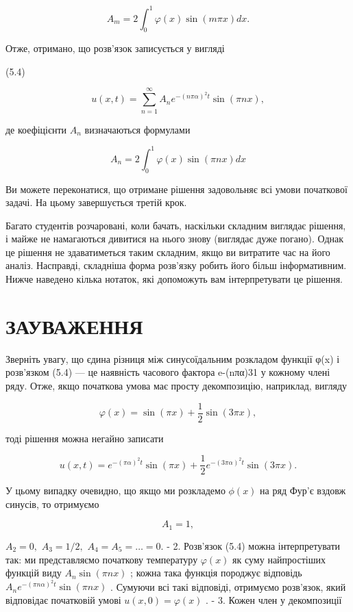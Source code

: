 \documentclass[
  ukrainian,
]{article}
\begin{document}
\[
A_m = 2 \int_0^1 \varphi(x) \sin(m\pi x) dx.
\]

Отже, отримано, що розв'язок записується у вигляді

(5.4)

\[
u(x, t) = \sum_{n=1}^{\infty} A_n e^{-(n\pi\alpha)^2 t} \sin(\pi n x),
\]

де коефіцієнти \(A_n\) визначаються формулами

\[
A_n = 2\int_0^1 \varphi(x) \sin(\pi nx) dx
\]

Ви можете переконатися, що отримане рішення задовольняє всі умови
початкової задачі. На цьому завершується третій крок.

Багато студентів розчаровані, коли бачать, наскільки складним виглядає
рішення, і майже не намагаються дивитися на нього знову (виглядає дуже
погано). Однак це рішення не здаватиметься таким складним, якщо ви
витратите час на його аналіз. Насправді, складніша форма розв'язку
робить його більш інформативним. Нижче наведено кілька нотаток, які
допоможуть вам інтерпретувати це рішення.

\section{ЗАУВАЖЕННЯ}\label{ux437ux430ux443ux432ux430ux436ux435ux43dux43dux44f-4}

Зверніть увагу, що єдина різниця між синусоїдальним розкладом функції
φ(x) і розв'язком (5.4) --- це наявність часового фактора e-(nπα)31 у
кожному члені ряду. Отже, якщо початкова умова має просту декомпозицію,
наприклад, вигляду

\[
\varphi(x) = \sin(\pi x) + \frac{1}{2}\sin(3\pi x),
\]

тоді рішення можна негайно записати

\[
u(x, t) = e^{-(\pi\alpha)^2 t} \sin(\pi x) + \frac{1}{2} e^{-(3\pi\alpha)^2 t} \sin(3\pi x).
\]

У цьому випадку очевидно, що якщо ми розкладемо \(\phi(x)\) на ряд Фур'є
вздовж синусів, то отримуємо

\[
A_1 = 1,
\]

\(A_2 = 0,\) \(A_3 = 1/2,\) \(A_4 = A_5 = \dots = 0.\) - 2. Розв'язок
(5.4) можна інтерпретувати так: ми представляємо початкову температуру
\(\varphi(x)\) як суму найпростіших функцій виду \(A_n \sin(\pi nx)\) ;
кожна така функція породжує відповідь
\(A_n e^{-(\pi n\alpha)^2 t} \sin(\pi nx)\) . Сумуючи всі такі
відповіді, отримуємо розв'язок, який відповідає початковій умові
\(u(x, 0) = \varphi(x)\) . - 3. Кожен член у декомпозиції
\end{document}
